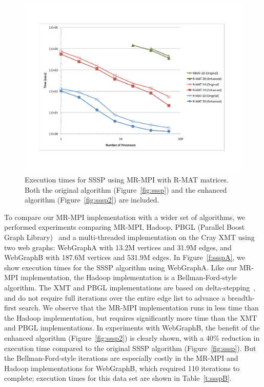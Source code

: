\begin{figure}[htb]
\includegraphics[width=\textwidth]{fig_sssp.pdf}
\caption{Execution times for SSSP using MR-MPI with R-MAT matrices.  
Both the original algorithm (Figure~\ref{fig:sssp}) and the enhanced 
algorithm (Figure~\ref{fig:sssp2}) are included.}
\label{f:sssp}
\end{figure}

To compare our MR-MPI implementation with a wider set of algorithms,
we performed experiments comparing MR-MPI, Hadoop, PBGL (Parallel
Boost Graph Library)~\cite{PBGL} and a multi-threaded implementation
on the Cray XMT using two web graphs: {WebGraphA} with 13.2M vertices
and 31.9M edges, and {WebGraphB} with 187.6M vertices and 531.9M
edges.  In Figure~\ref{f:ssspA}, we show execution times for the SSSP
algorithm using {WebGraphA}.  Like our MR-MPI implementation, the
Hadoop implementation is a Bellman-Ford-style~\cite{Bellman58,Ford62}
algorithm.  The XMT and PBGL implementations are based on
delta-stepping~\cite{MeyerSanders98}, and do not require full
iterations over the entire edge list to advance a breadth-first
search.  We observe that the MR-MPI implementation runs in less time
than the Hadoop implementation, but requires significantly more time
than the XMT and PBGL implementations.  In experiments with
{WebGraphB}, the benefit of the enhanced algorithm
(Figure~\ref{fig:sssp2}) is clearly shown, with a 40\% reduction in
execution time compared to the original SSSP algorithm
(Figure~\ref{fig:sssp}).  But the Bellman-Ford-style iterations are
especially costly in the MR-MPI and Hadoop implementations for
{WebGraphB}, which required 110 iterations to complete; execution
times for this data set are shown in Table~\ref{t:ssspB}.

